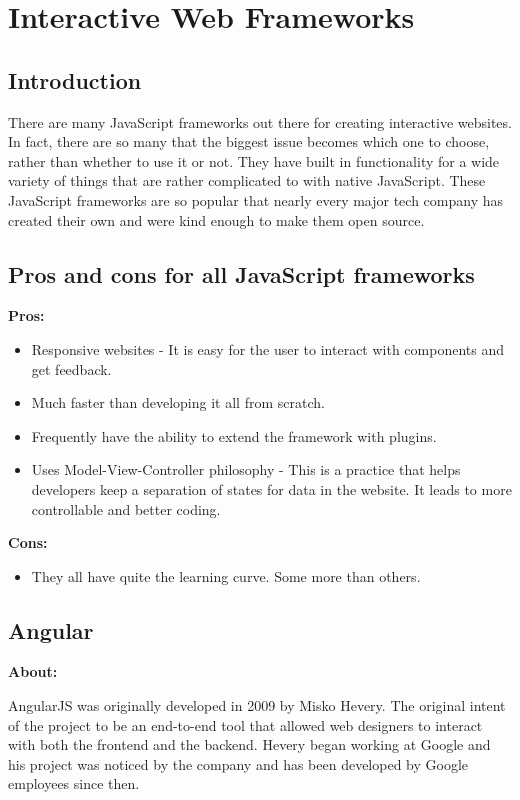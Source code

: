\documentclass[draftclsnofoot,onecolumn,letterpaper,10pt,compsoc]{IEEEtran}
\begin{document}
\section{Interactive Web Frameworks}
  \subsection{Introduction}

    There are many JavaScript frameworks out there for creating interactive websites.
    In fact, there are so many that the biggest issue becomes which one to choose, rather than whether to use it or not.
    They have built in functionality for a wide variety of things that are rather complicated to with native JavaScript.
    These JavaScript frameworks are so popular that nearly every major tech company has created their own and were kind enough to make them open source.


  \subsection{Pros and cons for all JavaScript frameworks}
    \textbf{Pros:}
    \begin{itemize}
      \item Responsive websites - It is easy for the user to interact with components and get feedback.
      \item Much faster than developing it all from scratch.
      \item Frequently have the ability to extend the framework with plugins.
      \item Uses Model-View-Controller philosophy - This is a practice that helps developers keep a separation of states for data in the website. It leads to more controllable and better coding.
    \end{itemize}

    \textbf{Cons:}
    \begin{itemize}
      \item They all have quite the learning curve. Some more than others.
    \end{itemize}

	\subsection{Angular}

    \textbf{About:}

    AngularJS was originally developed in 2009 by Misko Hevery\cite{AngularIntroduction}.
    The original intent of the project to be an end-to-end tool that allowed web designers to interact with both the frontend and the backend.\cite{HistoryOfAngular}
    Hevery began working at Google and his project was noticed by the company and has been developed by Google employees since then.
\end{document}
